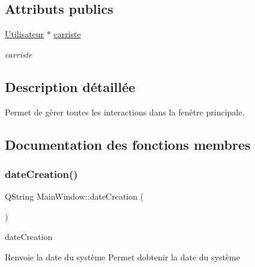 \subsection*{Attributs publics}
\begin{DoxyCompactItemize}
\item 
\mbox{\label{class_main_window_afcb22251b55d008d21b1889bab07863d}} 
\mbox{\hyperlink{class_utilisateur}{Utilisateur}} $\ast$ \mbox{\hyperlink{class_main_window_afcb22251b55d008d21b1889bab07863d}{carriste}}
\begin{DoxyCompactList}\small\item\em carriste \end{DoxyCompactList}\end{DoxyCompactItemize}


\subsection{Description détaillée}
Permet de gèrer toutes les interactions dans la fenêtre principale. 

\subsection{Documentation des fonctions membres}
\mbox{\label{class_main_window_ab960f7157f5e796f4d4aa8e4d33ce4a9}} 
\subsubsection{\texorpdfstring{date\+Creation()}{dateCreation()}}
{\footnotesize\ttfamily Q\+String Main\+Window\+::date\+Creation (\begin{DoxyParamCaption}{ }\end{DoxyParamCaption})}



date\+Creation 

\begin{DoxyReturn}{Renvoie}
la date du système Permet d\textquotesingle{}obtenir la date du système 
\end{DoxyReturn}
\mbox{\label{class_main_window_a67ddd81f2fe064ae24dd662f06111230}} 
